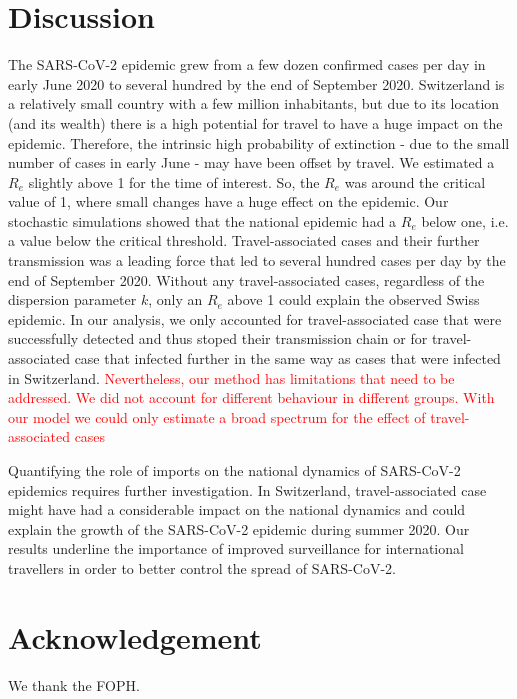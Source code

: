 \documentclass[10pt, a4paper, twoside]{article}
\begin{document}
\begin{multicols}{2}

\section{Discussion}
The SARS-CoV-2 epidemic grew from a few dozen confirmed cases per day in early June 2020 to several hundred by the end of September 2020. 
Switzerland is a relatively small country with a few million inhabitants, but due to its location (and its wealth) there is a high potential for travel to have a huge impact on the epidemic.
Therefore, the intrinsic high probability of extinction - due to the small number of cases in early June - may have been offset by travel.
We estimated a $R_e$ slightly above 1 for the time of interest. So, the $R_e$ was around the critical value of 1, where small changes have a huge effect on the epidemic. 
Our stochastic simulations showed that the national epidemic had a $R_e$ below one, i.e. a value below the critical threshold. 
Travel-associated cases and their further transmission was a leading force that led to several hundred cases per day by the end of September 2020. 
Without any travel-associated cases, regardless of the dispersion parameter $k$, only an $R_e$ above 1 could explain the observed Swiss epidemic. 
In our analysis, we only accounted for travel-associated case that were successfully detected and thus stoped their transmission chain or for travel-associated case that infected further in the same way as cases that were infected in Switzerland.
\textcolor{red}{Nevertheless, our method has limitations that need to be addressed. We did not account for different behaviour in different groups. With our model we could only estimate a broad spectrum for the effect of travel-associated cases}

Quantifying the role of imports on the national dynamics of SARS-CoV-2 epidemics requires further investigation. 
In Switzerland, travel-associated case might have had a considerable impact on the national dynamics and could explain the growth of the SARS-CoV-2 epidemic during summer 2020. 
Our results underline the importance of improved surveillance for international travellers in order to better control the spread of SARS-CoV-2.

\section{Acknowledgement}
We thank the FOPH.


\end{multicols}
\end{document}
